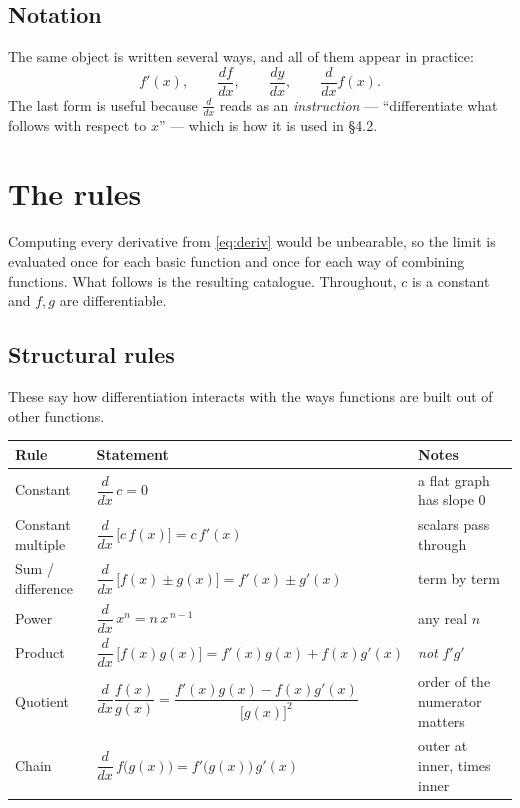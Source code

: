 \documentclass[11pt]{article}
\theoremstyle{plain}
\theoremstyle{definition}
\theoremstyle{remark}
\newcommand{\dd}[2]{\frac{d #1}{d #2}}
\begin{document}
\subsection{Notation}
The same object is written several ways, and all of them appear in practice:
\[
  f'(x),
  \qquad
  \dd{f}{x},
  \qquad
  \dd{y}{x},
  \qquad
  \frac{d}{dx}f(x) .
\]
The last form is useful because $\tfrac{d}{dx}$ reads as an \emph{instruction}
--- ``differentiate what follows with respect to $x$'' --- which is how it is
used in \S4.2.

\section{The rules}
Computing every derivative from \eqref{eq:deriv} would be unbearable, so the
limit is evaluated once for each basic function and once for each way of
combining functions. What follows is the resulting catalogue. Throughout, $c$ is
a constant and $f,g$ are differentiable.

\subsection{Structural rules}
These say how differentiation interacts with the ways functions are built out of
other functions.

\begin{center}
\renewcommand{\arraystretch}{1.75}
\begin{tabular}{@{}l l l@{}}
\toprule
\textbf{Rule} & \textbf{Statement} & \textbf{Notes} \\
\midrule
Constant & $\dfrac{d}{dx}\,c = 0$
  & a flat graph has slope $0$ \\
Constant multiple & $\dfrac{d}{dx}\,\bigl[c\,f(x)\bigr] = c\,f'(x)$
  & scalars pass through \\
Sum / difference & $\dfrac{d}{dx}\,\bigl[f(x)\pm g(x)\bigr]=f'(x)\pm g'(x)$
  & term by term \\
Power & $\dfrac{d}{dx}\,x^{n} = n\,x^{\,n-1}$
  & any real $n$ \\
Product & $\dfrac{d}{dx}\,\bigl[f(x)g(x)\bigr]=f'(x)g(x)+f(x)g'(x)$
  & \emph{not} $f'g'$ \\
Quotient & $\dfrac{d}{dx}\dfrac{f(x)}{g(x)}
            =\dfrac{f'(x)g(x)-f(x)g'(x)}{\bigl[g(x)\bigr]^{2}}$
  & order of the numerator matters \\
Chain & $\dfrac{d}{dx}\,f\bigl(g(x)\bigr)=f'\bigl(g(x)\bigr)\,g'(x)$
  & outer at inner, times inner \\
\bottomrule
\end{tabular}
\end{center}
\end{document}
